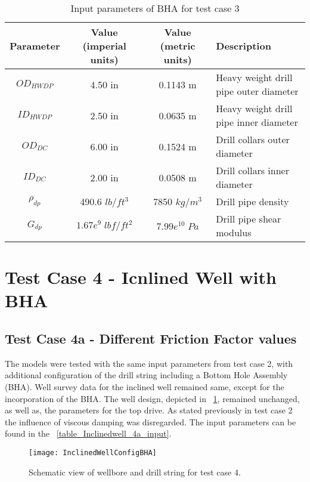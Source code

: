 \begin{table}[!h]
  \centering
  \begin{tabular}{|c|c|c|p{2.2in}|}
    \hline
    Parameter & Value (imperial units) & Value (metric units) & Description \\
    \hline
    $OD_{HWDP}$ & 4.50 in & 0.1143 m & Heavy weight drill pipe outer diameter \\
    \hline
    $ID_{HWDP}$ & 2.50 in & 0.0635 m & Heavy weight drill pipe inner diameter \\
    \hline
    $OD_{DC}$ & 6.00 in & 0.1524 m & Drill collars outer diameter \\
    \hline
    $ID_{DC}$ & 2.00 in & 0.0508 m & Drill collars inner diameter \\
    \hline
    $\rho_{dp}$ & 490.6 $lb/ft^{3}$ & 7850 $kg/m^{3}$ & Drill pipe density \\
    \hline
    $G_{dp}$ & $1.67e^9\;lbf/ft^2$ & $7.99e^{10}\;Pa$ & Drill pipe shear modulus \\
    \hline
  \end{tabular}
  \caption{Input parameters of BHA for test case 3}\label{Input Parameters TC3}
\end{table} 

\section{Test Case 4 - Icnlined Well with BHA}
\subsection{Test Case 4a - Different Friction Factor values}

The models were tested with the same input parameters from test case 2, with additional configuration of the drill string including a Bottom Hole Assembly (BHA). Well survey data for the inclined well remained same, except for the incorporation of the BHA. The well design, depicted in \figurename~\ref{figure_wellconfig_inclined_BHA}, remained unchanged, as well as, the parameters for the top drive. As stated previously in test case 2 the influence of viscous damping was disregarded. The input parameters can be found in the  \tablename~\ref{table_Inclinedwell_4a_input}.

\begin{figure}[!hbt]
  \centering
  \texttt{[image: InclinedWellConfigBHA]}
  \caption[Schematic view of test case 4.]{Schematic view of wellbore and drill string for test case 4.}\label{figure_wellconfig_inclined_BHA}
\end{figure}

